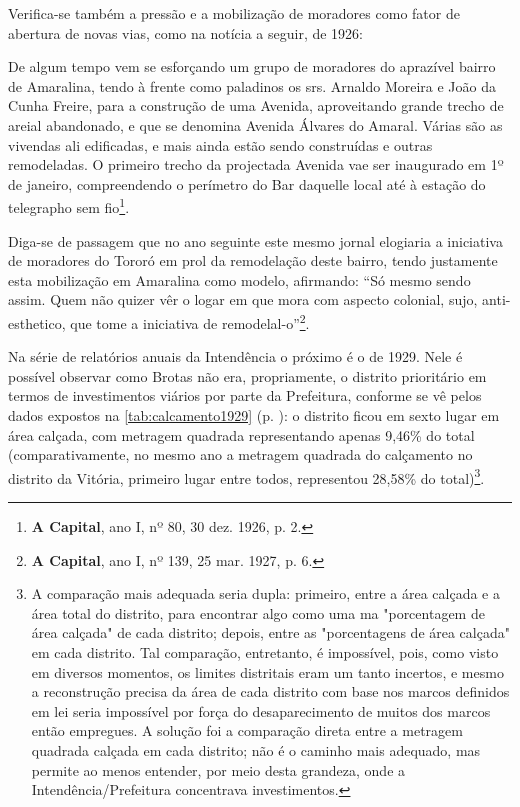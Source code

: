 Verifica-se também a pressão e a mobilização de moradores como fator de abertura de novas vias, como na notícia a seguir, de 1926:

\begin{citacao}
De algum tempo vem se esforçando um grupo de moradores do aprazível bairro de Amaralina, tendo à frente como paladinos os srs. Arnaldo Moreira e João da Cunha Freire, para a construção de uma Avenida, aproveitando grande trecho de areial abandonado, e que se denomina Avenida Álvares do Amaral.
Várias são as vivendas ali edificadas, e mais ainda estão sendo construídas e outras remodeladas.
O primeiro trecho da projectada Avenida vae ser inaugurado em 1º de janeiro, compreendendo o perímetro do Bar daquelle local até à estação do telegrapho sem fio\footnote{\textbf{A Capital}, ano I, nº 80, 30 dez. 1926, p. 2. }.
\end{citacao}

Diga-se de passagem que no ano seguinte este mesmo jornal elogiaria a iniciativa de moradores do Tororó em prol da remodelação deste bairro, tendo justamente esta mobilização em Amaralina como modelo, afirmando: ``Só mesmo sendo assim. Quem não quizer vêr o logar em que mora com aspecto colonial, sujo, anti-esthetico, que tome a iniciativa de remodelal-o''\footnote{\textbf{A Capital}, ano I, nº 139, 25 mar. 1927, p. 6.}.

Na série de relatórios anuais da Intendência o próximo é o de 1929. Nele é possível observar como Brotas não era, propriamente, o distrito prioritário em termos de investimentos viários por parte da Prefeitura, conforme se vê pelos dados expostos na \autoref{tab:calcamento1929} (p. \pageref{tab:calcamento1929}): o distrito ficou em sexto lugar em área calçada, com metragem quadrada representando apenas 9,46\% do total (comparativamente, no mesmo ano a metragem quadrada do calçamento no distrito da Vitória, primeiro lugar entre todos, representou 28,58\% do total)\footnote{A comparação mais adequada seria dupla: primeiro, entre a área calçada e a área total do distrito, para encontrar algo como uma ma "porcentagem de área calçada" de cada distrito; depois, entre as "porcentagens de área calçada" em cada distrito. Tal comparação, entretanto, é impossível, pois, como visto em diversos momentos, os limites distritais eram um tanto incertos, e mesmo a reconstrução precisa da área de cada distrito com base nos marcos definidos em lei seria impossível por força do desaparecimento de muitos dos marcos então empregues. A solução foi a comparação direta entre a metragem quadrada calçada em cada distrito; não é o caminho mais adequado, mas permite ao menos entender, por meio desta grandeza, onde a Intendência/Prefeitura concentrava investimentos.}.

